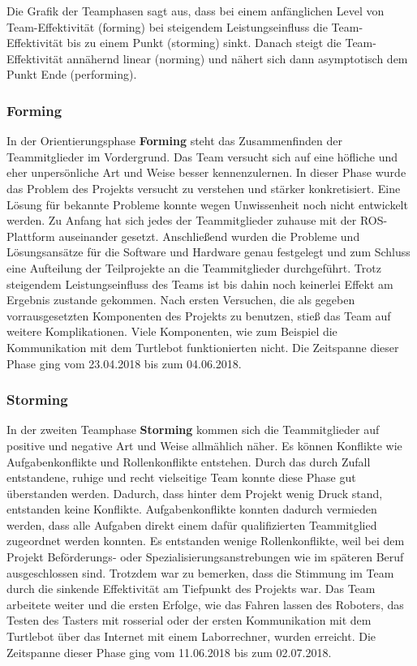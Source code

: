 \documentclass[a4paper,12pt,headsepline]{scrartcl}
\begin{document}
		Die Grafik der Teamphasen sagt aus, dass bei einem anfänglichen Level von Team-Effektivität (forming) bei steigendem Leistungseinfluss die Team-Effektivität bis zu einem Punkt (storming) sinkt. Danach steigt die Team-Effektivität annähernd linear (norming) und nähert sich dann asymptotisch dem Punkt Ende (performing). 
	\subsubsection{Forming}
		In der Orientierungsphase \textbf{Forming} steht das Zusammenfinden der Teammitglieder im Vordergrund. Das Team versucht sich auf eine höfliche und eher unpersönliche Art und Weise besser kennenzulernen. In dieser Phase wurde das Problem des Projekts versucht zu verstehen und stärker konkretisiert. Eine Lösung für bekannte Probleme konnte wegen Unwissenheit noch nicht entwickelt werden. Zu Anfang hat sich jedes der Teammitglieder zuhause mit der ROS-Plattform auseinander gesetzt. Anschließend wurden die Probleme und Lösungsansätze für die Software und Hardware genau festgelegt und zum Schluss eine Aufteilung der Teilprojekte an die Teammitglieder durchgeführt. Trotz steigendem Leistungseinfluss des Teams ist bis dahin noch keinerlei Effekt am Ergebnis zustande gekommen. Nach ersten Versuchen, die als gegeben vorrausgesetzten Komponenten des Projekts zu benutzen, stieß das Team auf weitere Komplikationen. Viele Komponenten, wie zum Beispiel die Kommunikation mit dem Turtlebot funktionierten nicht. Die Zeitspanne dieser Phase ging vom 23.04.2018 bis zum 04.06.2018. 
	\subsubsection{Storming}
		In der zweiten Teamphase \textbf{Storming} kommen sich die Teammitglieder auf positive und negative Art und Weise allmählich näher. Es können Konflikte wie Aufgabenkonflikte und Rollenkonflikte entstehen. Durch das durch Zufall entstandene, ruhige und recht vielseitige Team konnte diese Phase gut überstanden werden. Dadurch, dass hinter dem Projekt wenig Druck stand, entstanden keine Konflikte. Aufgabenkonflikte konnten dadurch vermieden werden, dass alle Aufgaben direkt einem dafür qualifizierten Teammitglied zugeordnet werden konnten. Es entstanden wenige Rollenkonflikte, weil bei dem Projekt Beförderungs- oder Spezialisierungsanstrebungen wie im späteren Beruf ausgeschlossen sind. Trotzdem war zu bemerken, dass die Stimmung im Team durch die sinkende Effektivität am Tiefpunkt des Projekts war. Das Team arbeitete weiter und die ersten Erfolge, wie das Fahren lassen des Roboters, das Testen des Tasters mit rosserial oder der ersten Kommunikation mit dem Turtlebot über das Internet mit einem Laborrechner, wurden erreicht. Die Zeitspanne dieser Phase ging vom 11.06.2018 bis zum 02.07.2018.
\end{document}
